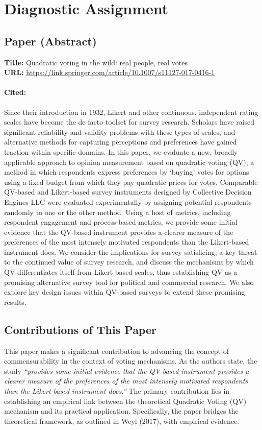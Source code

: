 \documentclass[11pt,a4paper]{article}
\begin{document}

\section*{Diagnostic Assignment}

\subsection*{Paper (Abstract)}
\textbf{Title:} Quadratic voting in the wild: real people, real votes \\
\textbf{URL:} \url{https://link.springer.com/article/10.1007/s11127-017-0416-1}

\paragraph{Cited:} Since their introduction in 1932, Likert and other continuous, independent rating scales have become the de facto toolset for survey research. Scholars have raised significant reliability and validity problems with these types of scales, and alternative methods for capturing perceptions and preferences have gained traction within specific domains. In this paper, we evaluate a new, broadly applicable approach to opinion measurement based on quadratic voting (QV), a method in which respondents express preferences by ‘buying’ votes for options using a fixed budget from which they pay quadratic prices for votes. Comparable QV-based and Likert-based survey instruments designed by Collective Decision Engines LLC were evaluated experimentally by assigning potential respondents randomly to one or the other method. Using a host of metrics, including respondent engagement and process-based metrics, we provide some initial evidence that the QV-based instrument provides a clearer measure of the preferences of the most intensely motivated respondents than the Likert-based instrument does. We consider the implications for survey satisficing, a key threat to the continued value of survey research, and discuss the mechanisms by which QV differentiates itself from Likert-based scales, thus establishing QV as a promising alternative survey tool for political and commercial research. We also explore key design issues within QV-based surveys to extend these promising results.


\subsection*{Contributions of This Paper}
\noindent This paper makes a significant contribution to advancing the concept of commensurability in the context of voting mechanisms. As the authors state, the study \textit{``provides some initial evidence that the QV-based instrument provides a clearer measure of the preferences of the most intensely motivated respondents than the Likert-based instrument does.''} The primary contribution lies in establishing an empirical link between the theoretical Quadratic Voting (QV) mechanism and its practical application. Specifically, the paper bridges the theoretical framework, as outlined in Weyl (2017), with empirical evidence.
\end{document}
